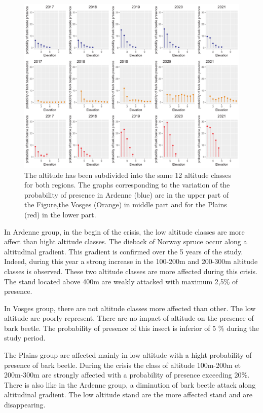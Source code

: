 \documentclass[3p,procedia]{elsarticle}
\begin{document}
\begin{figure}
\centering
	\includegraphics[width=\textwidth]{synthese_color_06_2022.png}
     \caption{The altitude has been subdivided into the same 12 altitude classes for both regions. 
The graphs corresponding to the variation of the probability of presence in Ardenne (blue) are in the upper part of the Figure,the Vosges (Orange) in middle part and for the Plains (red) in the lower part.
}
	\label{alti_sco}
\end{figure}

In Ardenne group, in the begin of the crisis, the low altitude classes are more affect than hight altitude classes.
The dieback of Norway spruce occur along a altitudinal  gradient.
This gradient is confirmed over the 5 years of the study.
Indeed, during this year a strong increase in the 100-200m and 200-300m altitude classes is observed. 
These two altitude classes are more affected during this crisis.
The stand located above 400m are weakly attacked with maximum 2,5\% of presence.

In Vosges group, there are not altitude classes more affected than other. 
The low altitude are poorly represent. There are no impact of altitude on the presence of bark beetle. 
The probability of presence of this insect is inferior of 5 \% during the study period.

The Plains group are affected mainly in low altitude with a hight probability of presence of bark beetle. 
During the crisis the class of altitude 100m-200m et 200m-300m are strongly affected with a probability of presence exceeding 20\%.
There is also like in the Ardenne group, a diminution of bark beetle attack along altitudinal gradient.
The low altitude stand are the more affected stand and are disappearing.
\end{document}
